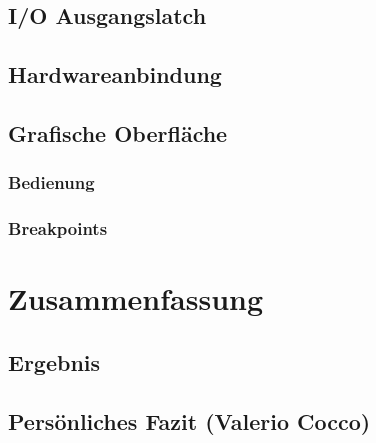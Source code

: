 \subsection{I/O Ausgangslatch}


\subsection{Hardwareanbindung}



\subsection{Grafische Oberfläche}

\subsubsection{Bedienung}

\subsubsection{Breakpoints}



\section{Zusammenfassung}

\subsection{Ergebnis}


\subsection{Persönliches Fazit (Valerio Cocco)}

